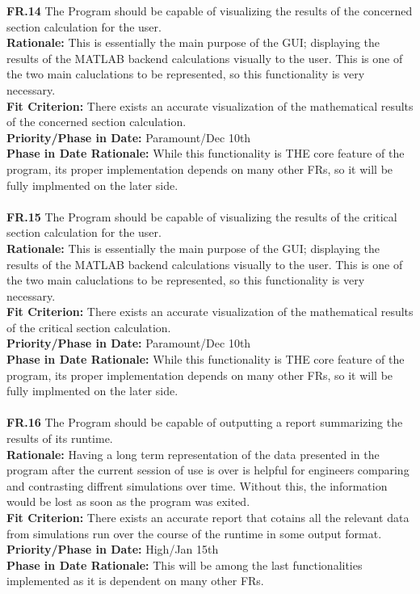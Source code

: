 \documentclass[12pt]{article}
\begin{document}
  \noindent\textbf{FR.14} The Program should be capable of visualizing the results of the concerned section calculation for the user.\\
  \textbf{Rationale:} This is essentially the main purpose of the GUI; displaying the results of the MATLAB backend calculations visually to the user. This is one of the two
  main caluclations to be represented, so this functionality is very necessary.\\
  \textbf{Fit Criterion:} There exists an accurate visualization of the mathematical results of the concerned section calculation.\\
  \textbf{Priority/Phase in Date:} Paramount/Dec 10th\\
  \textbf{Phase in Date Rationale:} While this functionality is THE core feature of the program, its proper implementation depends on many other FRs, so it will be fully implmented on the later side.\\\\

  \noindent\textbf{FR.15} The Program should be capable of visualizing the results of the critical section calculation for the user.\\
  \textbf{Rationale:} This is essentially the main purpose of the GUI; displaying the results of the MATLAB backend calculations visually to the user. This is one of the two
  main caluclations to be represented, so this functionality is very necessary.\\
  \textbf{Fit Criterion:} There exists an accurate visualization of the mathematical results of the critical section calculation.\\
  \textbf{Priority/Phase in Date:} Paramount/Dec 10th\\
  \textbf{Phase in Date Rationale:} While this functionality is THE core feature of the program, its proper implementation depends on many other FRs, so it will be fully implmented on the later side.\\\\

  \noindent\textbf{FR.16} The Program should be capable of outputting a report summarizing the results of its runtime.\\
  \textbf{Rationale:} Having a long term representation of the data presented in the program after the current session of use is over is helpful for engineers comparing
  and contrasting diffrent simulations over time. Without this, the information would be lost as soon as the program was exited.\\
  \textbf{Fit Criterion:} There exists an accurate report that cotains all the relevant data from simulations run over the course of the runtime in some output format.\\
  \textbf{Priority/Phase in Date:} High/Jan 15th\\
  \textbf{Phase in Date Rationale:} This will be among the last functionalities implemented as it is dependent on many other FRs.\\\\
\end{document}
